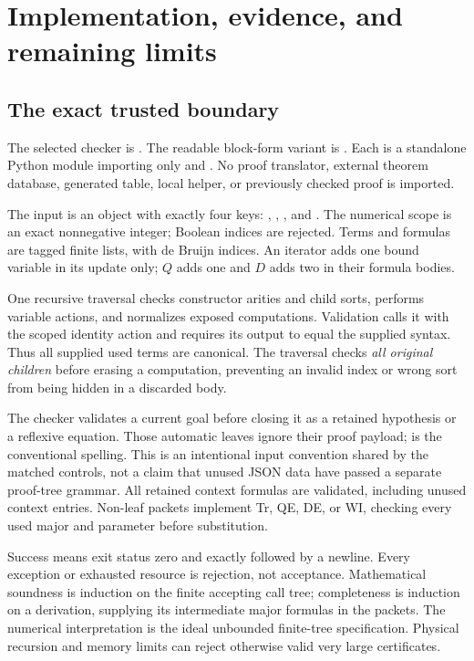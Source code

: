 \section{Implementation, evidence, and remaining limits}
\label{sec:implementation}

\subsection{The exact trusted boundary}

The selected checker is
.
The readable block-form variant is
.
Each is a standalone Python module importing only  and
. No proof translator, external theorem database, generated
table, local helper, or previously checked proof is imported.

The input is an object with exactly four keys:
, , , and .
The numerical scope is an exact nonnegative integer; Boolean indices
are rejected. Terms and formulas are tagged finite lists, with de Bruijn
indices. An iterator adds one bound variable in its update only;
$Q$ adds one and $D$ adds two in their formula bodies.

One recursive traversal checks constructor arities and child sorts,
performs variable actions, and normalizes exposed computations.
Validation calls it with the scoped identity action and requires its
output to equal the supplied syntax. Thus all supplied used terms
are canonical. The traversal checks \emph{all original children}
before erasing a computation, preventing an invalid index or wrong
sort from being hidden in a discarded body.

The checker validates a current goal before closing it as a retained
hypothesis or a reflexive equation. Those automatic leaves ignore
their proof payload;  is the conventional spelling.
This is an intentional input convention shared by the matched controls,
not a claim that unused JSON data have passed a separate proof-tree
grammar. All retained context formulas are validated, including
unused context entries. Non-leaf packets implement Tr, QE, DE,
or WI, checking every used major and parameter before substitution.

Success means exit status zero and exactly  followed
by a newline. Every exception or exhausted resource is rejection,
not acceptance. Mathematical soundness is induction on the finite
accepting call tree; completeness is induction on a derivation,
supplying its intermediate major formulas in the packets.
The numerical interpretation is the ideal unbounded finite-tree
specification. Physical recursion and memory limits can reject
otherwise valid very large certificates.

